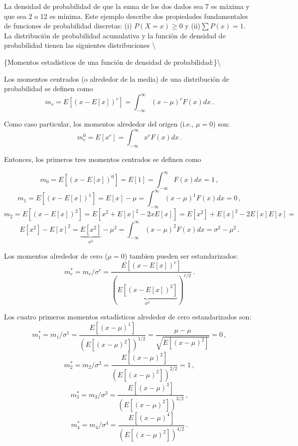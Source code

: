 \documentclass[
]{agujournal2019}
\begin{document}
\begin{center}
\end{center}

La densidad de probabilidad de que la suma de los dos dados sea 7 es
máxima y que sea 2 o 12 es mínima. Este ejemplo describe dos propiedades
fundamentales de funciones de probabilidad discretas: (i)
\(P(X=x) \ge 0\) y (ii)\(\sum{P(x)}=1\). La distribución de probabilidad
acumulativa y la función de densidad de probabilidad tienen las
siguientes distribuciones \textbackslash{}

\begin{center}
\end{center}

\vspace{0.5cm}

\{\noindent Momentos estadísticos de una función de densidad de
probabilidad:\}\textbackslash{}

Los momentos centrados (o alrededor de la media) de una distribución de
probabilidad se definen como
\[m_r=E[(x-E[x])^r]=\int^{\infty}_{-\infty} (x-\mu)^rF(x)dx\,.\]

Como caso particular, los momentos alrededor del origen (i.e.,
\(\mu=0\)) son: \[m^0_r=E[x^r]=\int^{\infty}_{-\infty} x^rF(x)dx\,.\]

Entonces, los primeros tres momentos centrados se definen como

\[m_0=E[(x-E[x])^0]=E[1]=\int^{\infty}_{-\infty}F(x)dx=1\,,\]
\[m_1=E[(x-E[x])^1]=E[x]-\mu=\int^{\infty}_{-\infty} (x-\mu)^1 F(x)dx=0\,,\]
\[m_2=E[(x-E[x])^2]=E[x^2 + E[x]^2 -2xE[x]]=
      E[x^2]+E[x]^2-2E[x]E[x]=\]
\[E[x^2]-E[x]^2=\underbrace{E[x^2]}_{\sigma^2}-\mu^2=\int^{\infty}_{-\infty} (x-\mu)^2 F(x)dx=\sigma^2-\mu^2\,.\]

Los momentos alrededor de cero (\(\mu=0\)) tambien pueden ser
estandarizados:
\[m^*_r=m_r/\sigma^r=\frac{E[(x-E[x])^r]}{(\underbrace{E[(x-E[x])^2]}_{\sigma^2})^{r/2}}\,.\]

Los cuatro primeros momentos estadísticos alrededor de cero
estandarizados son:
\[m^*_1=m_1/\sigma^1=\frac{E[(x-\mu)^1]}{(E[(x-\mu)^2])^{1/2}}=\frac{\mu-\mu}{\sqrt{E[(x-\mu)^2]}}=0\,,\]
\[m^*_2=m_2/\sigma^2=\frac{E[(x-\mu)^2]}{(E[(x-\mu)^2])^{2/2}}=1\,,\]
\[m^*_3=m_3/\sigma^3=\frac{E[(x-\mu)^3]}{(E[(x-\mu)^2])^{3/2}}\,,\]
\[m^*_4=m_4/\sigma^4=\frac{E[(x-\mu)^4]}{(E[(x-\mu)^2])^{4/2}}\,.\]
\end{document}
